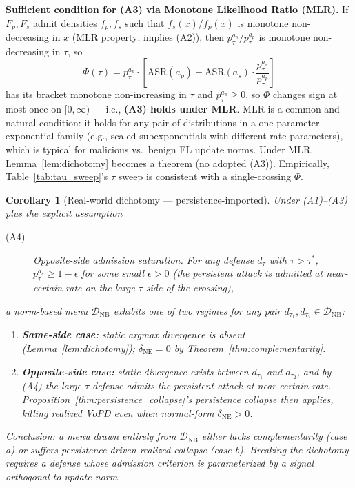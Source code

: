 \documentclass{article}
\newtheorem{corollary}{Corollary}
\begin{document}
\textbf{Sufficient condition for (A3) via Monotone Likelihood Ratio (MLR).} If $F_p, F_s$ admit densities $f_p, f_s$ such that $f_s(x)/f_p(x)$ is monotone non-decreasing in $x$ (MLR property; implies (A2)), then $p^{a_s}_\tau / p^{a_p}_\tau$ is monotone non-decreasing in $\tau$, so
\[
\Phi(\tau) = p^{a_p}_\tau \cdot \left[ \mathrm{ASR}(a_p) - \mathrm{ASR}(a_s) \cdot \frac{p^{a_s}_\tau}{p^{a_p}_\tau} \right]
\]
has its bracket monotone non-increasing in $\tau$ and $p^{a_p}_\tau \geq 0$, so $\Phi$ changes sign at most once on $[0, \infty)$ --- i.e., \textbf{(A3) holds under MLR}. MLR is a common and natural condition: it holds for any pair of distributions in a one-parameter exponential family (e.g., scaled subexponentials with different rate parameters), which is typical for malicious vs.\ benign FL update norms. Under MLR, Lemma~\ref{lem:dichotomy} becomes a theorem (no adopted (A3)). Empirically, Table~\ref{tab:tau_sweep}'s $\tau$ sweep is consistent with a single-crossing $\Phi$.

\begin{corollary}[Real-world dichotomy --- persistence-imported]
\label{cor:dichotomy}
Under (A1)--(A3) plus the explicit assumption
\begin{description}
\item[(A4)] \emph{Opposite-side admission saturation.} For any defense $d_\tau$ with $\tau > \tau^*$, $p^{a_s}_\tau \geq 1 - \epsilon$ for some small $\epsilon > 0$ (the persistent attack is admitted at near-certain rate on the large-$\tau$ side of the crossing),
\end{description}
a norm-based menu $\mathcal{D}_{\mathrm{NB}}$ exhibits one of two regimes for any pair $d_{\tau_1}, d_{\tau_2} \in \mathcal{D}_{\mathrm{NB}}$:
\begin{enumerate}[label=(\alph*)]
\item \textbf{Same-side case:} static argmax divergence is absent (Lemma~\ref{lem:dichotomy}); $\delta_{\mathrm{NE}} = 0$ by Theorem~\ref{thm:complementarity}.
\item \textbf{Opposite-side case:} static divergence exists between $d_{\tau_1}$ and $d_{\tau_2}$, and by (A4) the large-$\tau$ defense admits the persistent attack at near-certain rate. Proposition~\ref{thm:persistence_collapse}'s persistence collapse then applies, killing realized VoPD even when normal-form $\delta_{\mathrm{NE}} > 0$.
\end{enumerate}
\textit{Conclusion:} a menu drawn entirely from $\mathcal{D}_{\mathrm{NB}}$ either lacks complementarity (case a) or suffers persistence-driven realized collapse (case b). Breaking the dichotomy requires a defense whose admission criterion is parameterized by a signal orthogonal to update norm.
\end{corollary}
\end{document}
